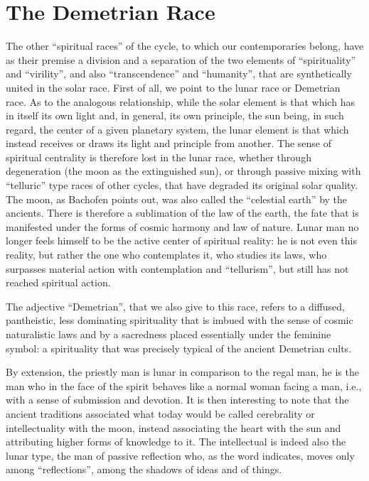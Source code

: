 \section{The Demetrian Race}

\label{sec:DemetrianRace}

The other ``spiritual races'' of the cycle, to which our contemporaries belong, have as their premise a division and a separation of the two elements of ``spirituality'' and ``virility'', and also ``transcendence'' and ``humanity'', that are synthetically united in the solar race. First of all, we point to the lunar race or Demetrian race. As to the analogous relationship, while the solar element is that which has in itself its own light and, in general, its own principle, the sun being, in such regard, the center of a given planetary system, the lunar element is that which instead receives or draws its light and principle from another. The sense of spiritual centrality is therefore lost in the lunar race, whether through degeneration (the moon as the extinguished sun), or through passive mixing with ``telluric'' type races of other cycles, that have degraded its original solar quality. The moon, as Bachofen points out, was also called the ``celestial earth'' by the ancients. There is therefore a sublimation of the law of the earth, the fate that is manifested under the forms of cosmic harmony and law of nature. Lunar man no longer feels himself to be the active center of spiritual reality: he is not even this reality, but rather the one who contemplates it, who studies its laws, who surpasses material action with contemplation and ``tellurism'', but still has not reached spiritual action.

The adjective ``Demetrian'', that we also give to this race, refers to a diffused, pantheistic, less dominating spirituality that is imbued with the sense of cosmic naturalistic laws and by a sacredness placed essentially under the feminine symbol: a spirituality that was precisely typical of the ancient Demetrian cults.

By extension, the priestly man is lunar in comparison to the regal man, he is the man who in the face of the spirit behaves like a normal woman facing a man, i.e., with a sense of submission and devotion. It is then interesting to note that the ancient traditions associated what today would be called cerebrality or intellectuality with the moon, instead associating the heart with the sun and attributing higher forms of knowledge to it. The intellectual is indeed also the lunar type, the man of passive reflection who, as the word indicates, moves only among ``reflections'', among the shadows of ideas and of things.

